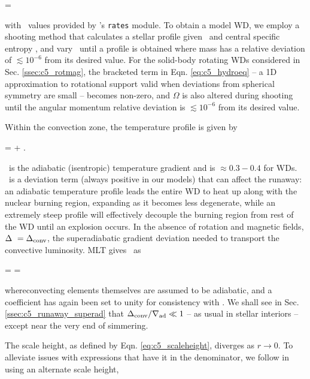 \eqbegin
{} = \epscc
\label{eq:c5_dldm}
\eqend

\noindent with \epscc\ values provided by \mesa's \texttt{rates} module.  To obtain a model WD, we employ a shooting method that calculates a stellar profile given \rhoc\ and central specific entropy \Sc, and vary \rhoc\ until a profile is obtained where mass has a relative deviation of $\lesssim 10^{-6}$ from its desired value.  For the solid-body rotating WDs considered in Sec. \ref{ssec:c5_rotmag}, the bracketed term in Eqn. \ref{eq:c5_hydroeq} -- a 1D approximation to rotational support valid when deviations from spherical symmetry are small -- becomes non-zero, and $\Omega$ is also altered during shooting until the angular momentum relative deviation is $\lesssim 10^{-6}$ from its desired value.

Within the convection zone, the temperature profile is given by

\eqbegin
\nabla \equiv {} = \nablaad + \deltanab.
\label{eq:c5_tempgrad}
\eqend

\noindent \nablaad\ is the adiabatic (isentropic) temperature gradient and is $\approx 0.3 -  0.4$ for WDs.  \deltanab\ is a deviation term (always positive in our models) that can affect the runaway: an adiabatic temperature profile leads the entire WD to heat up along with the nuclear burning region, expanding as it becomes less degenerate, while an extremely steep profile will effectively decouple the burning region from rest of the WD until an explosion occurs.  In the absence of rotation and magnetic fields, $\deltanab\ = \dnabconv$, the superadiabatic gradient deviation needed to transport the convective luminosity.  MLT gives \dnabconv\ as

\eqbegin
\dnabconv =  = 
\label{eq:c5_superad_dev}
\eqend

\noindent where{\charles convecting elements themselves are assumed to be adiabatic}, and a coefficient has again been set to unity for consistency with \citeal{piroc08}.  We shall see in Sec. \ref{ssec:c5_runaway_superad} that $\dnabconv/\nablaad \ll 1$ -- as usual in stellar interiors -- except near the very end of simmering.

The scale height, as defined by Eqn. \ref{eq:c5_scaleheight}, diverges as $r\rightarrow0$.  To alleviate issues with expressions that have it in the denominator, we follow \cite{paxt+11} in using an alternate scale height,

